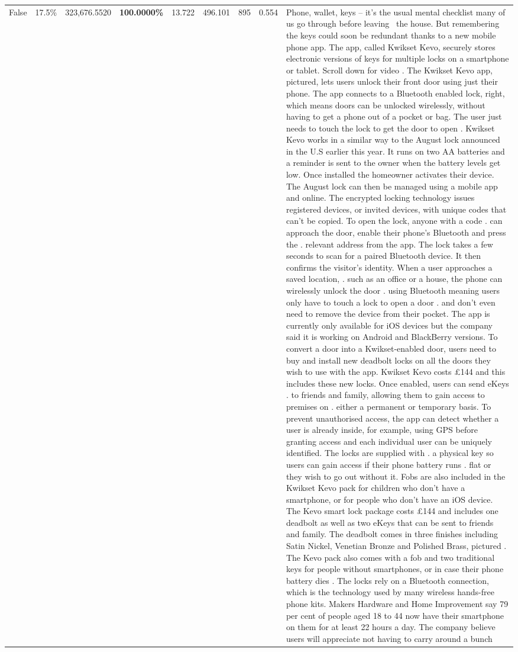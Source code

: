 \begin{table}[H]
\begin{tabular}{lllrlllll}
False & 17.5\% & 323,676.5520 & \bfseries \color{red} 100.0000\% & 13.722 & 496.101 & 895 & 0.554 & Phone, wallet, keys – it’s the usual mental checklist many of us go through before leaving  the house. But remembering the keys could soon be redundant thanks to a new mobile phone app. The app, called Kwikset Kevo, securely stores electronic versions of keys for multiple locks on a smartphone or tablet. Scroll down for video . The Kwikset Kevo app, pictured, lets users unlock their front door using just their phone. The app connects to a Bluetooth enabled lock, right, which means doors can be unlocked wirelessly, without having to get a phone out of a pocket or bag. The user just needs to touch the lock to get the door to open . Kwikset Kevo works in a similar way to the August lock announced in the U.S earlier this year. It runs on two AA batteries and a reminder is sent to the owner when the battery levels get low. Once installed the homeowner activates their device. The August lock can then be managed using a mobile app and online. The encrypted locking technology issues registered devices, or invited devices, with unique codes that can't be copied. To open the lock, anyone with a code . can approach the door, enable their phone's Bluetooth and press the . relevant address from the app. The lock takes a few seconds to scan for a paired Bluetooth device. It then confirms the visitor's identity. When a user approaches a saved location, . such as an office or a house, the phone can wirelessly unlock the door . using Bluetooth meaning users only have to touch a lock to open a door . and don't even need to remove the device from their pocket. The app is currently only available for iOS devices but the company said it is working on Android and BlackBerry versions. To convert a door into a Kwikset-enabled door, users need to buy and install new deadbolt locks on all the doors they wish to use with the app. Kwikset Kevo costs £144 and this includes these new locks. Once enabled, users can send eKeys . to friends and family, allowing them to gain access to premises on . either a permanent or temporary basis. To prevent unauthorised access, the app can detect whether a user is already inside, for example, using GPS before granting access and each individual user can be uniquely identified. The locks are supplied with . a physical key so users can gain access if their phone battery runs . flat or they wish to go out without it. Fobs are also included in the Kwikset Kevo pack for children who don't have a smartphone, or for people who don't have an iOS device. The Kevo smart lock package costs £144 and includes one deadbolt as well as two eKeys that can be sent to friends and family. The deadbolt comes in three finishes including Satin Nickel, Venetian Bronze and Polished Brass, pictured . The Kevo pack also comes with a fob and two traditional keys for people without smartphones, or in case their phone battery dies . The locks rely on a Bluetooth connection, which is the technology used by many wireless hands-free phone kits. Makers Hardware and Home Improvement say 79 per cent of people aged 18 to 44 now have their smartphone on them for at least 22 hours a day. The company believe users will appreciate not having to carry around a bunch 
\end{tabular}
\end{table}
